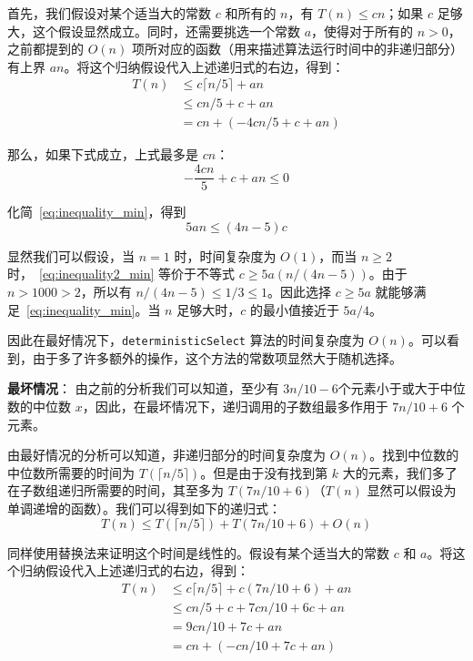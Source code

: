 首先，我们假设对某个适当大的常数 $c$ 和所有的 $n$，有 $T(n) \leq cn$；如果 $c$ 足够大，这个假设显然成立。同时，还需要挑选一个常数 $a$，使得对于所有的 $n > 0$，之前都提到的 $O(n)$ 项所对应的函数（用来描述算法运行时间中的非递归部分）有上界 $an$。将这个归纳假设代入上述递归式的右边，得到：\begin{align*}
    T(n) &\leq c \lceil n/5 \rceil+ an \\
    &\leq cn/5 + c + an \\
    &= cn + (-4cn/5 + c + an)
\end{align*}

那么，如果下式成立，上式最多是 $cn$：\begin{equation}
    -\frac{4cn}{5} + c + an \leq 0
    \label{eq:inequality_min}
\end{equation}

化简~\autoref{eq:inequality_min}，得到 \begin{equation}
    5an \leq (4n - 5)c
    \label{eq:inequality2_min}
\end{equation}

显然我们可以假设，当 $n = 1$ 时，时间复杂度为 $O(1)$，而当 $n \ge 2$ 时，~\autoref{eq:inequality2_min} 等价于不等式 $c \geq 5a(n/(4n-5))$。由于 $n > 1000 > 2$，所以有 $n/(4n-5) \leq 1/3 \leq 1$。因此选择 $c \ge 5a$ 就能够满足~\autoref{eq:inequality_min}。当 $n$ 足够大时，$c$ 的最小值接近于 $5a/4$。

因此在最好情况下，\texttt{deterministicSelect} 算法的时间复杂度为 \( O(n) \)。可以看到，由于多了许多额外的操作，这个方法的常数项显然大于随机选择。

\textbf{最坏情况}：
由之前的分析我们可以知道，至少有 $3n/10-6$个元素小于或大于中位数的中位数 $x$，因此，在最坏情况下，递归调用的子数组最多作用于 $7n/10+6$ 个元素。

由最好情况的分析可以知道，非递归部分的时间复杂度为 $O(n)$。找到中位数的中位数所需要的时间为 $T(\lceil n/5 \rceil)$。但是由于没有找到第 $k$ 大的元素，我们多了在子数组递归所需要的时间，其至多为 $T(7n/10+6)$（$T(n)$ 显然可以假设为单调递增的函数）。我们可以得到如下的递归式：\[T(n)\leq T(\lceil n/5 \rceil)+T(7n/10+6)+O(n)\]

同样使用替换法来证明这个时间是线性的。假设有某个适当大的常数 $c$ 和 $a$。将这个归纳假设代入上述递归式的右边，得到：\begin{align*}
    T(n) &\leq c \lceil n/5 \rceil + c(7n/10 + 6) + an \\
    &\leq cn/5 + c + 7cn/10 + 6c + an \\
    &= 9cn/10 + 7c + an \\
    &= cn + (-cn/10 + 7c + an)
\end{align*}

